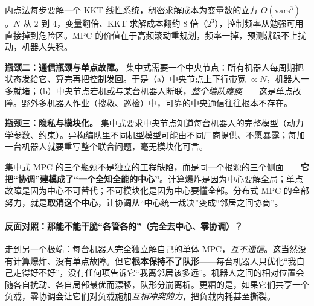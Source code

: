 \noindent 内点法每步要解一个 KKT 线性系统，稠密求解成本为变量数的立方 $O(\text{vars}^3)$。$N$ 从 $2$ 到 $4$，变量翻倍、KKT 求解成本翻约 $8$ 倍（$2^3$），控制频率从勉强可用直接掉到危险区。MPC 的价值在于高频滚动重规划，频率一掉，预测就跟不上扰动，机器人失稳。

\textbf{瓶颈二：通信瓶颈与单点故障。} 集中式需要一个中央节点：所有机器人每周期把状态发给它、算完再把控制发回。于是（a）中央节点上下行带宽 $\propto N$，机器人一多就堵；（b）中央节点宕机或与某台机器人断联，\emph{整个编队瘫痪}——这是单点故障。野外多机器人作业（搜救、巡检）中，可靠的中央通信往往根本不存在。

\textbf{瓶颈三：隐私与模块化。} 集中式要求中央节点知道每台机器人的完整模型（动力学参数、约束）。异构编队里不同机型模型可能由不同厂商提供、不愿暴露；每加一台机器人就要重写整个联合问题，毫无模块化可言。

\begin{insight}[三个瓶颈是同一根源的三个侧面]\label{ins:dmpc-three-bottleneck}
集中式 MPC 的三个瓶颈不是独立的工程缺陷，而是同一个根源的三个侧面——\textbf{它把“协调”建模成了“一个全知全能的中心”}。计算爆炸是因为中心要解全局；单点故障是因为中心不可替代；不可模块化是因为中心要懂全部。分布式 MPC 的全部努力，就是\textbf{取消这个中心}，让协调从“中心统一裁决”变成“邻居之间协商”。
\end{insight}

\paragraph{反面对照：那能不能干脆“各管各的”（完全去中心、零协调）？}
走到另一个极端：每台机器人完全独立解自己的单体 MPC，\emph{互不通信}。这当然没有计算爆炸、没有单点故障。但它\textbf{根本保持不了队形}——每台机器人只优化“我自己走得好不好”，没有任何项告诉它“我离邻居该多远”。机器人之间的相对位置会随各自扰动、各自局部最优而漂移，队形分崩离析。更糟的是，如果它们共享一个负载，零协调会让它们对负载施加\emph{互相冲突的力}，把负载内耗甚至撕裂。


